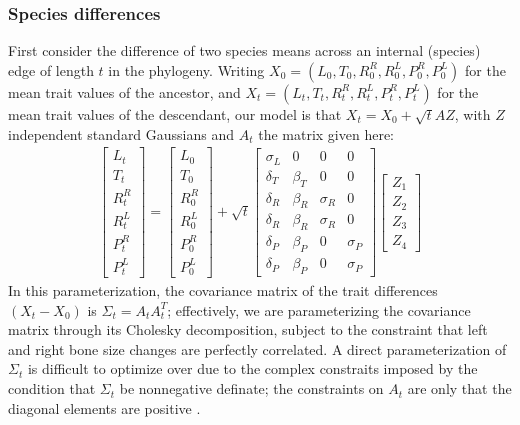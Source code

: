 \documentclass[12pt]{article}
\begin{document}
\subsubsection*{Species differences}

First consider the difference of two species means across an internal (species) edge of length $t$ in the phylogeny.
Writing $X_0=(L_0,T_0,R^R_0,R^L_0,P^R_0,P^L_0)$ for the mean trait values of the ancestor,
and $X_t=(L_t,T_t,R^R_t,R^L_t,P^R_t,P^L_t)$ for the mean trait values of the descendant,
our model is that $X_t = X_0 + \sqrt{t} A Z$, with $Z$ independent standard Gaussians and $A_t$ the matrix given here:
\begin{align} \label{eqn:species_matrix}
\begin{bmatrix}
    L_t \\ T_t \\ R^R_t \\ R^L_t \\ P^R_t \\ P^L_t 
\end{bmatrix}
=
\begin{bmatrix}
    L_0 \\ T_0 \\ R^R_0 \\ R^L_0 \\ P^R_0 \\ P^L_0 
\end{bmatrix}
+
\sqrt{t}
\begin{bmatrix}
    \sigma_L &  0  & 0  & 0  \\
    \delta_T   &  \beta_T   & 0  &   0 \\
    \delta_R   &  \beta_R   & \sigma_R   &   0 \\
    \delta_R   &  \beta_R   & \sigma_R   &   0 \\
    \delta_P   &  \beta_P   & 0  &   \sigma_P  \\
    \delta_P   &  \beta_P   & 0  &   \sigma_P  
\end{bmatrix}
\begin{bmatrix}
    Z_1 \\ Z_2 \\ Z_3 \\ Z_4
\end{bmatrix}
\end{align}
In this parameterization, the covariance matrix of the trait differences $(X_t - X_0)$ is $\Sigma_t = A_t A_t^T$;
effectively, we are parameterizing the covariance matrix through its Cholesky decomposition,
subject to the constraint that left and right bone size changes are perfectly correlated.
A direct parameterization of $\Sigma_t$ is difficult to optimize over due to the complex constraits imposed by
the condition that $\Sigma_t$ be nonnegative definate;
the constraints on $A_t$ are only that the diagonal elements are positive \citep{pourahmadi1999joint}.
\end{document}
